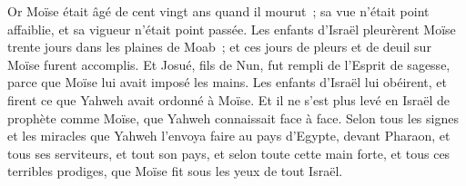 \begin{multicols}{2}
Or Moïse était âgé de cent vingt ans quand il mourut~; sa vue n'était point affaiblie, et sa vigueur n'était point passée.
Les enfants d'Israël pleurèrent Moïse trente jours dans les plaines de Moab~; et ces jours de pleurs et de deuil sur Moïse furent accomplis.
Et Josué, fils de Nun, fut rempli de l'Esprit de sagesse, parce que Moïse lui avait imposé les mains. Les enfants d'Israël lui obéirent, et firent ce que Yahweh avait ordonné à Moïse.
Et il ne s'est plus levé en Israël de prophète comme Moïse, que Yahweh connaissait face à face.
Selon tous les signes et les miracles que Yahweh l'envoya faire au pays d'Egypte, devant Pharaon, et tous ses serviteurs, et tout son pays,
et selon toute cette main forte, et tous ces terribles prodiges, que Moïse fit sous les yeux de tout Israël.
\PPE{}
\end{multicols}

